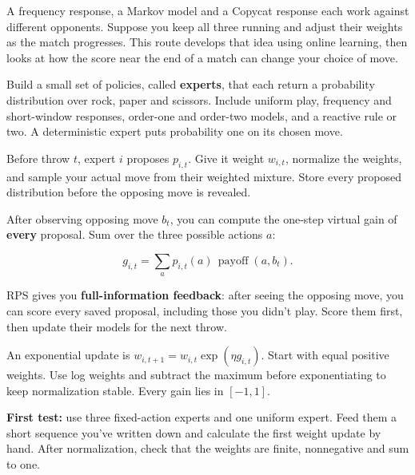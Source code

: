 \documentclass[11pt]{article}
\begin{document}
\thispagestyle{plain}


\clearpage

\clearpage
{}

\begin{context}
A frequency response, a Markov model and a Copycat response each work against different opponents. Suppose you keep all three running and adjust their weights as the match progresses. This route develops that idea using online learning, then looks at how the score near the end of a match can change your choice of move.

\end{context}


Build a small set of policies, called \textbf{experts}, that each return a probability distribution over rock, paper and scissors. Include uniform play, frequency and short-window responses, order-one and order-two models, and a reactive rule or two. A deterministic expert puts probability one on its chosen move.


Before throw $t$, expert $i$ proposes $p_{i,t}$. Give it weight $w_{i,t}$, normalize the weights, and sample your actual move from their weighted mixture. Store every proposed distribution before the opposing move is revealed.


After observing opposing move $b_t$, you can compute the one-step virtual gain of \textbf{every} proposal. Sum over the three possible actions $a$:


\[
g_{i,t} = \sum_a p_{i,t}(a)\,\operatorname{payoff}(a,b_t).
\]

RPS gives you \textbf{full-information feedback}: after seeing the opposing move, you can score every saved proposal, including those you didn't play. Score them first, then update their models for the next throw.


An exponential update is $w_{i,t+1}=w_{i,t}\exp(\eta g_{i,t})$. Start with equal positive weights. Use log weights and subtract the maximum before exponentiating to keep normalization stable. Every gain lies in $[-1,1]$.


\begin{checkpoint}
\textbf{First test:} use three fixed-action experts and one uniform expert. Feed them a short sequence you've written down and calculate the first weight update by hand. After normalization, check that the weights are finite, nonnegative and sum to one.
\end{checkpoint}
\end{document}
